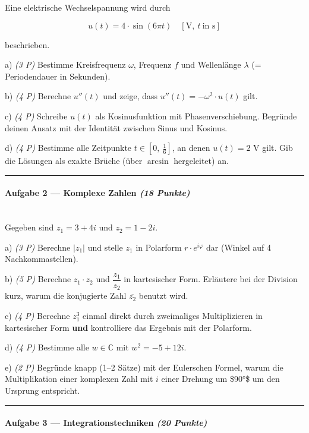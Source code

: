 \documentclass[11pt, a4paper]{article}
\begin{document}
Eine elektrische Wechselspannung wird durch

\[
u(t) = 4 \cdot \sin(6\pi t) \quad [\text{V},\ t\ \text{in s}]
\]

beschrieben.


a) \textit{(3 P)} Bestimme Kreisfrequenz $\omega$, Frequenz $f$ und Wellenlänge $\lambda$ (= Periodendauer in Sekunden).


b) \textit{(4 P)} Berechne $u''(t)$ und zeige, dass $u''(t) = -\omega^2 \cdot u(t)$ gilt.


c) \textit{(4 P)} Schreibe $u(t)$ als Kosinusfunktion mit Phasenverschiebung. Begründe deinen Ansatz mit der Identität zwischen Sinus und Kosinus.


d) \textit{(4 P)} Bestimme alle Zeitpunkte $t \in [0,\ \tfrac{1}{6}]$, an denen $u(t) = 2$ V gilt. Gib die Lösungen als exakte Brüche (über $\arcsin$ hergeleitet) an.



\noindent\textcolor{rulegray}{\rule{\linewidth}{0.4pt}}


\paragraph{Aufgabe 2 — Komplexe Zahlen \textit{(18 Punkte)}}\mbox{}\\[2pt]

Gegeben sind $z_1 = 3+4i$ und $z_2 = 1-2i$.


a) \textit{(3 P)} Berechne $|z_1|$ und stelle $z_1$ in Polarform $r \cdot e^{i\varphi}$ dar (Winkel auf 4 Nachkommastellen).


b) \textit{(5 P)} Berechne $z_1 \cdot z_2$ und $\dfrac{z_1}{z_2}$ in kartesischer Form. Erläutere bei der Division kurz, warum die konjugierte Zahl $\overline{z_2}$ benutzt wird.


c) \textit{(4 P)} Berechne $z_1^3$ einmal direkt durch zweimaliges Multiplizieren in kartesischer Form \textbf{und} kontrolliere das Ergebnis mit der Polarform.


d) \textit{(4 P)} Bestimme alle $w \in \mathbb{C}$ mit $w^2 = -5+12i$.


e) \textit{(2 P)} Begründe knapp (1–2 Sätze) mit der Eulerschen Formel, warum die Multiplikation einer komplexen Zahl mit $i$ einer Drehung um \$90°\$ um den Ursprung entspricht.



\noindent\textcolor{rulegray}{\rule{\linewidth}{0.4pt}}


\paragraph{Aufgabe 3 — Integrationstechniken \textit{(20 Punkte)}}\mbox{}\\[2pt]
\end{document}
